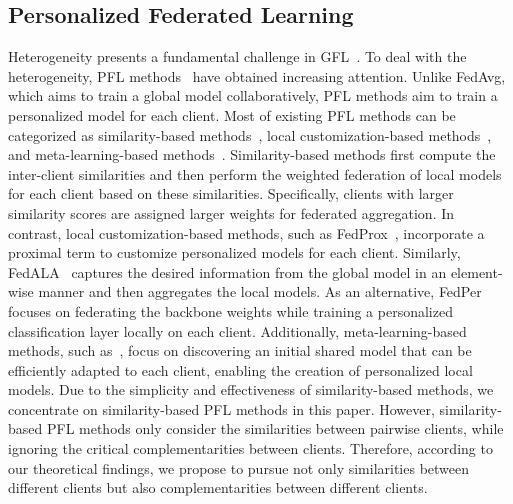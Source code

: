 \subsection{Personalized Federated Learning}
Heterogeneity presents a fundamental challenge in GFL~\cite{ye2023heterogeneous}. To deal with the heterogeneity, PFL methods~\cite{MLSYS2020_1f5fe839, 9743558, Arivazhagan2019} have obtained increasing attention. Unlike FedAvg, which aims to train a global model collaboratively, PFL methods aim to train a personalized model for each client. Most of existing PFL methods can be categorized as similarity-based methods~\cite{baek2023personalized, li2023fedgta, wentao2025fediih}, local customization-based methods~\cite{MLSYS2020_1f5fe839, Arivazhagan2019, NEURIPS2020_f4f1f13c}, and meta-learning-based methods~\cite{chen2018federated, NEURIPS2020_24389bfe, 10485381}. Similarity-based methods first compute the inter-client similarities and then perform the weighted federation of local models for each client based on these similarities. Specifically, clients with larger similarity scores are assigned larger weights for federated aggregation. In contrast, local customization-based methods, such as FedProx~\cite{MLSYS2020_1f5fe839}, incorporate a proximal term to customize personalized models for each client. Similarly, FedALA~\cite{zhang2023fedala} captures the desired information from the global model in an element-wise manner and then aggregates the local models. As an alternative, FedPer~\cite{Arivazhagan2019} focuses on federating the backbone weights while training a personalized classification layer locally on each client. Additionally, meta-learning-based methods, such as~\cite{NEURIPS2020_24389bfe}, focus on discovering an initial shared model that can be efficiently adapted to each client, enabling the creation of personalized local models. Due to the simplicity and effectiveness of similarity-based methods, we concentrate on similarity-based PFL methods in this paper. However, similarity-based PFL methods only consider the similarities between pairwise clients, while ignoring the critical complementarities between clients. Therefore, according to our theoretical findings, we propose to pursue not only similarities between different clients but also complementarities between different clients. 


